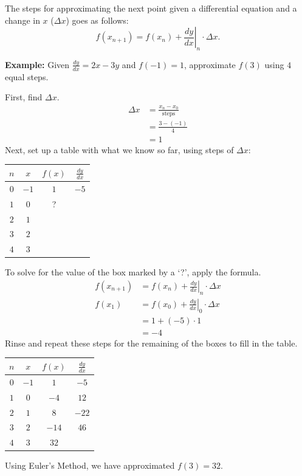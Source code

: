 \documentclass[12pt]{article}
\begin{document}
The steps for approximating the next point given a differential equation and a change in $x$ ($\Delta x$) goes as follows:
\[ f(x_{n+1}) = f(x_n) + \left. \frac{dy}{dx} \right \vert_n \cdot \Delta x. \]

\noindent \textbf{Example:} Given $\frac{dy}{dx} = 2x-3y$ and $f(-1) = 1$, approximate $f(3)$ using $4$ equal steps.

\noindent First, find $\Delta x$.
\begin{align*}
	\Delta x & = \frac{x_n - x_0}{\text{steps}} \\[6pt]
	& = \frac{3-(-1)}{4}               \\[6pt]
	& = 1
\end{align*}
Next, set up a table with what we know so far, using steps of $\Delta x$:
\begin{center}
	\begin{tabular}{|c|c|c|c|}
		\hline
		$n$ & $x$  & $f(x)$ & $\frac{dy}{dx}$ \\
		\hline \hline
		$0$ & $-1$ & $1$    & $-5$            \\
		\hline
		$1$ & $0$  & ?      &                 \\
		\hline
		$2$ & $1$  &        &                 \\
		\hline
		$3$ & $2$  &        &                 \\
		\hline
		$4$ & $3$  &        &                 \\
		\hline
	\end{tabular}
\end{center}
To solve for the value of the box marked by a `?', apply the formula.
\begin{align*}
	f(x_{n+1}) & = f(x_n) + \left. \frac{dy}{dx} \right \vert_n \cdot \Delta x \\[6pt]
	f(x_1)     & = f(x_0) + \left. \frac{dy}{dx} \right \vert_0 \cdot \Delta x \\[6pt]
	& = 1 + (-5) \cdot 1                                            \\
	& = -4
\end{align*}
Rinse and repeat these steps for the remaining of the boxes to fill in the table.
\begin{center}
	\begin{tabular}{|c|c|c|c|}
		\hline
		$n$ & $x$  & $f(x)$ & $\frac{dy}{dx}$ \\
		\hline \hline
		$0$ & $-1$ & $1$    & $-5$            \\
		\hline
		$1$ & $0$  & $-4$   & $12$            \\
		\hline
		$2$ & $1$  & $8$    & $-22$           \\
		\hline
		$3$ & $2$  & $-14$  & $46$            \\
		\hline
		$4$ & $3$  & $32$   &                 \\
		\hline
	\end{tabular}
\end{center}
Using Euler's Method, we have approximated $f(3) = 32$.
\end{document}
